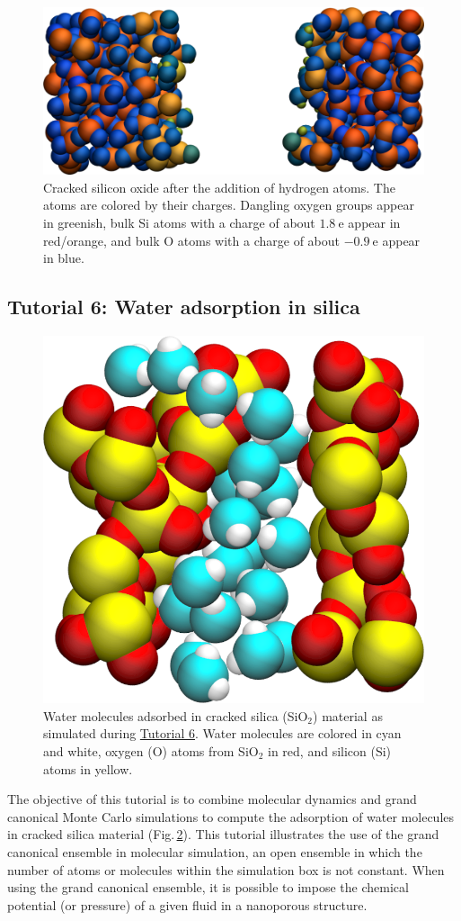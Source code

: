 \documentclass[9pt,tutorial]{livecoms}
\begin{document}
\begin{figure}
\includegraphics[width=\linewidth]{SIO-decorated}
\caption{Cracked silicon oxide after the addition of hydrogen atoms. The atoms are colored by their charges. Dangling oxygen groups appear in greenish, bulk Si atoms with a charge of about $1.8~\text{e}$  appear in red/orange, and bulk O atoms with a charge of about $-0.9 ~ \text{e}$ appear in blue.}
\label{fig:SIO-decorated}
\end{figure}

\subsection{Tutorial 6: Water adsorption in silica}
\label{gcmc-silica-label}

\begin{figure}
\centering
\includegraphics[width=0.55\linewidth]{GCMC}
\caption{Water molecules adsorbed in cracked silica (SiO$_2$) material as simulated during \hyperref[gcmc-silica-label]{Tutorial 6}. Water molecules are colored in cyan and white, oxygen (O) atoms from SiO$_2$ in red, and silicon (Si) atoms in yellow.}
\label{fig:GCMC}
\end{figure}

\noindent The objective of this tutorial is to combine molecular dynamics and grand canonical Monte Carlo simulations to compute the adsorption of water molecules in cracked silica material (Fig.\,\ref{fig:GCMC}). This tutorial illustrates the use of the grand canonical ensemble in molecular simulation, an open ensemble in which the number of atoms or molecules within the simulation box is not constant. When using the grand canonical ensemble, it is possible to impose the chemical potential (or pressure) of a given fluid in a nanoporous structure.
\end{document}
